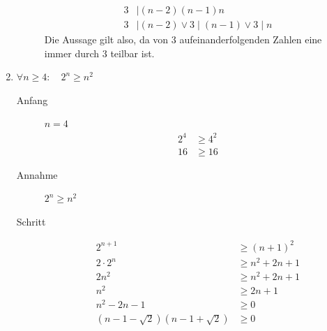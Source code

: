 \documentclass[11pt, a4paper]{article}
\begin{document}
\begin{enumerate}
\begin{description}
\begin{align*}
				3 &\mid (n-2)(n-1)n \\
				3 &\mid (n-2) \lor 3 \mid (n-1) \lor 3 \mid n
			\end{align*}
			Die Aussage gilt also, da von $3$ aufeinanderfolgenden Zahlen eine immer durch $3$ teilbar ist.
		\end{description}
	\item $\forall n \geq 4 : \quad 2^n \geq n^2$
		\begin{description}
			\item[Anfang] $n=4$
				\begin{align*}
					2^4 &\geq 4^2 \\
					16 &\geq 16
				\end{align*}
			\item[Annahme] $2^n \geq n^2$
			\item[Schritt] 
				\begin{align*}
					2^{n+1} &\geq (n+1)^2 \\
					2 \cdot 2^n &\geq n^2 + 2n + 1 \tag{Verwende Annahme} \\
					2 n^2 &\geq n^2 + 2n + 1 \tag{$- n^2$} \\
					n^2 &\geq 2n + 1 \\
					n^2 -2n - 1 &\geq 0 \tag{Zerlegung in Linearfaktoren} \\
					(n-1-\sqrt{2})(n-1+\sqrt{2}) &\geq 0 \tag{Beide Terme $\geq 0$ weil $n \geq 4$}
				\end{align*}
		\end{description}
\end{enumerate}
\end{document}
